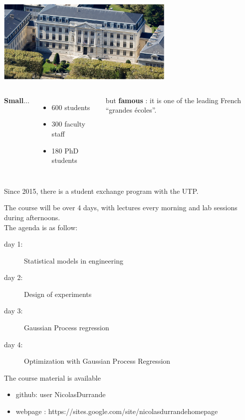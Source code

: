 \documentclass{beamer}
\begin{document}
\begin{frame}{}
\begin{center}
\includegraphics[height=4cm]{figures/Mines}
\end{center}
\begin{columns}[t]
\column{5cm}
\textbf{Small}...
\begin{itemize}
	\item 600 students
	\item 300 faculty staff
	\item 180 PhD students 
\end{itemize}
\column{5cm}
but \textbf{famous} : it is one of the leading French ``grandes écoles''.\\
\end{columns}
\vspace{5mm}
Since 2015, there is a student exchange program with the UTP.
\end{frame}

\begin{frame}{}
The course will be over 4 days, with lectures every morning and lab sessions during afternoons. \\ \vspace{5mm}
The agenda is as follow:
\vspace{0.2cm}
\begin{description}
	\item[day 1:] Statistical models in engineering
	\item[day 2:] Design of experiments
	\item[day 3:] Gaussian Process regression
	\item[day 4:] Optimization  with Gaussian Process Regression
\end{description}
\vspace{5mm}
The course material is available
\begin{itemize}
	\item[] github: user NicolasDurrande
	\item[] webpage : \small{https://sites.google.com/site/nicolasdurrandehomepage}
\end{itemize}
\end{frame}
\end{document}
